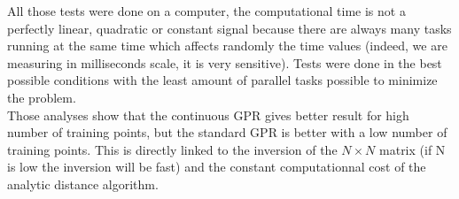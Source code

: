 All those tests were done on a computer, the computational time is not a perfectly linear, quadratic or constant signal because there are always many tasks running at the same time which affects randomly the time values (indeed, we are measuring in milliseconds scale, it is very sensitive). Tests were done in the best possible conditions with the least amount of parallel tasks possible to minimize the problem.\\

Those analyses show that the continuous GPR gives better result for high number of training points, but the standard GPR is better with a low number of training points. This is directly linked to the inversion of the $N \times N$ matrix (if N is low the inversion will be fast) and the constant computationnal cost of the analytic distance algorithm.
